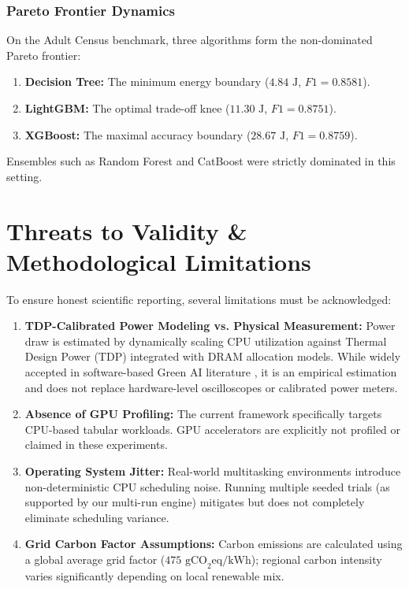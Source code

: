 \documentclass[conference]{IEEEtran}
\begin{document}
\subsubsection{Pareto Frontier Dynamics}
On the Adult Census benchmark, three algorithms form the non-dominated Pareto frontier:
\begin{enumerate}
    \item \textbf{Decision Tree:} The minimum energy boundary ($4.84\text{ J}$, $F1 = 0.8581$).
    \item \textbf{LightGBM:} The optimal trade-off knee ($11.30\text{ J}$, $F1 = 0.8751$).
    \item \textbf{XGBoost:} The maximal accuracy boundary ($28.67\text{ J}$, $F1 = 0.8759$).
\end{enumerate}
Ensembles such as Random Forest and CatBoost were strictly dominated in this setting.

\section{Threats to Validity \& Methodological Limitations}
To ensure honest scientific reporting, several limitations must be acknowledged:
\begin{enumerate}
    \item \textbf{TDP-Calibrated Power Modeling vs. Physical Measurement:} Power draw is estimated by dynamically scaling CPU utilization against Thermal Design Power (TDP) integrated with DRAM allocation models. While widely accepted in software-based Green AI literature \cite{garcia2019estimation}, it is an empirical estimation and does not replace hardware-level oscilloscopes or calibrated power meters.
    \item \textbf{Absence of GPU Profiling:} The current framework specifically targets CPU-based tabular workloads. GPU accelerators are explicitly not profiled or claimed in these experiments.
    \item \textbf{Operating System Jitter:} Real-world multitasking environments introduce non-deterministic CPU scheduling noise. Running multiple seeded trials (as supported by our multi-run engine) mitigates but does not completely eliminate scheduling variance.
    \item \textbf{Grid Carbon Factor Assumptions:} Carbon emissions are calculated using a global average grid factor ($475\text{ gCO}_2\text{eq/kWh}$); regional carbon intensity varies significantly depending on local renewable mix.
\end{enumerate}
\end{document}
